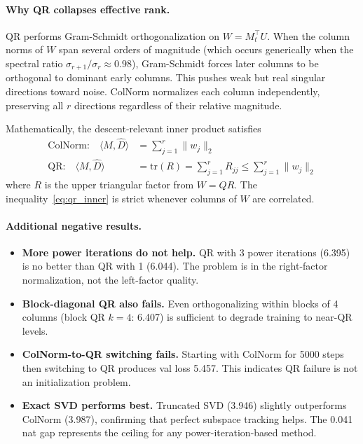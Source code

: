 \documentclass[11pt]{article}
\newcommand{\norm}[1]{\|#1\|}
\newcommand{\inner}[2]{\langle #1, #2 \rangle}
\begin{document}
\paragraph{Why QR collapses effective rank.} QR performs Gram-Schmidt orthogonalization on $W = M_t^\top U$. When the column norms of $W$ span several orders of magnitude (which occurs generically when the spectral ratio $\sigma_{r+1}/\sigma_r \approx 0.98$), Gram-Schmidt forces later columns to be orthogonal to dominant early columns. This pushes weak but real singular directions toward noise. ColNorm normalizes each column independently, preserving all $r$ directions regardless of their relative magnitude.

Mathematically, the descent-relevant inner product satisfies
\begin{align}
\text{ColNorm:} \quad \inner{M}{\hat{D}} &= \sum_{j=1}^r \norm{w_j}_2 \label{eq:cn_inner} \\
\text{QR:} \quad \inner{M}{\hat{D}} &= \mathrm{tr}(R) = \sum_{j=1}^r R_{jj} \leq \sum_{j=1}^r \norm{w_j}_2 \label{eq:qr_inner}
\end{align}
where $R$ is the upper triangular factor from $W = QR$. The inequality~\eqref{eq:qr_inner} is strict whenever columns of $W$ are correlated.

\paragraph{Additional negative results.}
\begin{itemize}[nosep]
    \item \textbf{More power iterations do not help.} QR with 3 power iterations (6.395) is no better than QR with 1 (6.044). The problem is in the right-factor normalization, not the left-factor quality.
    \item \textbf{Block-diagonal QR also fails.} Even orthogonalizing within blocks of 4 columns (block QR $k{=}4$: 6.407) is sufficient to degrade training to near-QR levels.
    \item \textbf{ColNorm-to-QR switching fails.} Starting with ColNorm for 5000 steps then switching to QR produces val loss 5.457. This indicates QR failure is not an initialization problem.
    \item \textbf{Exact SVD performs best.} Truncated SVD (3.946) slightly outperforms ColNorm (3.987), confirming that perfect subspace tracking helps. The 0.041 nat gap represents the ceiling for any power-iteration-based method.
\end{itemize}
\end{document}
